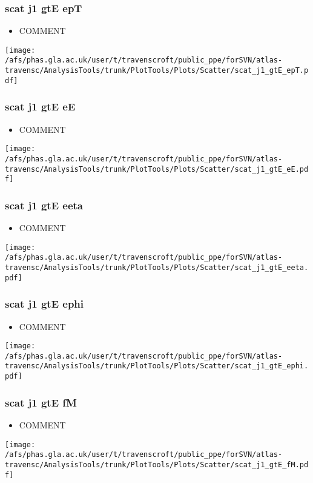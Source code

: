 \documentclass{beamer}
\begin{document}
\begin{frame}
\frametitle{scat j1 gtE epT}
\begin{itemize}
\item COMMENT
\end{itemize}
\begin{center}
\texttt{[image: /afs/phas.gla.ac.uk/user/t/travenscroft/public\_ppe/forSVN/atlas-travensc/AnalysisTools/trunk/PlotTools/Plots/Scatter/scat\_j1\_gtE\_epT.pdf]}
\end{center}
\end{frame}

\begin{frame}
\frametitle{scat j1 gtE eE}
\begin{itemize}
\item COMMENT
\end{itemize}
\begin{center}
\texttt{[image: /afs/phas.gla.ac.uk/user/t/travenscroft/public\_ppe/forSVN/atlas-travensc/AnalysisTools/trunk/PlotTools/Plots/Scatter/scat\_j1\_gtE\_eE.pdf]}
\end{center}
\end{frame}

\begin{frame}
\frametitle{scat j1 gtE eeta}
\begin{itemize}
\item COMMENT
\end{itemize}
\begin{center}
\texttt{[image: /afs/phas.gla.ac.uk/user/t/travenscroft/public\_ppe/forSVN/atlas-travensc/AnalysisTools/trunk/PlotTools/Plots/Scatter/scat\_j1\_gtE\_eeta.pdf]}
\end{center}
\end{frame}

\begin{frame}
\frametitle{scat j1 gtE ephi}
\begin{itemize}
\item COMMENT
\end{itemize}
\begin{center}
\texttt{[image: /afs/phas.gla.ac.uk/user/t/travenscroft/public\_ppe/forSVN/atlas-travensc/AnalysisTools/trunk/PlotTools/Plots/Scatter/scat\_j1\_gtE\_ephi.pdf]}
\end{center}
\end{frame}

\begin{frame}
\frametitle{scat j1 gtE fM}
\begin{itemize}
\item COMMENT
\end{itemize}
\begin{center}
\texttt{[image: /afs/phas.gla.ac.uk/user/t/travenscroft/public\_ppe/forSVN/atlas-travensc/AnalysisTools/trunk/PlotTools/Plots/Scatter/scat\_j1\_gtE\_fM.pdf]}
\end{center}
\end{frame}
\end{document}
